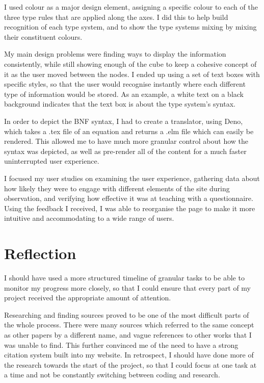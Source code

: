 \documentclass{l4proj}
\begin{document}
I used colour as a major design element, assigning a specific colour to each of the three type rules that are applied along the axes.  I did this to help build recognition of each type system, and to show the type systems mixing by mixing their constituent colours.

My main design problems were finding ways to display the information consistently, while still showing enough of the cube to keep a cohesive concept of it as the user moved between the nodes.  I ended up using a set of text boxes with specific styles, so that the user would recognise instantly where each different type of information would be stored.  As an example, a white text on a black background indicates that the text box is about the type system's syntax.

In order to depict the BNF syntax, I had to create a translator, using Deno, which takes a .tex file of an equation and returns a .elm file which can easily be rendered.  This allowed me to have much more granular control about how the syntax was depicted, as well as pre-render all of the content for a much faster uninterrupted user experience.

I focused my user studies on examining the user experience, gathering data about how likely they were to engage with different elements of the site during observation, and verifying how effective it was at teaching with a questionnaire.  Using the feedback I received, I was able to reorganise the page to make it more intuitive and accommodating to a wide range of users.

\section{Reflection}

I should have used a more structured timeline of granular tasks to be able to monitor my progress more closely, so that I could ensure that every part of my project received the appropriate amount of attention. 

Researching and finding sources proved to be one of the most difficult parts of the whole process.  There were many sources which referred to the same concept as other papers by a different name, and vague references to other works that I was unable to find.  This further convinced me of the need to have a strong citation system built into my website.  In retrospect, I should have done more of the research towards the start of the project, so that I could focus at one task at a time and not be constantly switching between coding and research.
\end{document}
